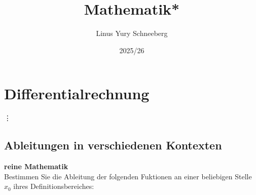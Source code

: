 \documentclass{article}
\title{Mathematik*}
\author{Linus Yury Schneeberg}
\date{2025/26}
\begin{document}
	\maketitle
	\tableofcontents
	\newpage
	
	\section{Differentialrechnung}
	\vdots
	\subsection{Ableitungen in verschiedenen Kontexten}
	\textbf{reine Mathematik} \\
	Bestimmen Sie die Ableitung der folgenden Fuktionen an einer beliebigen Stelle \(x_0\) ihres Definitionsbereiches:
	
\end{document}
